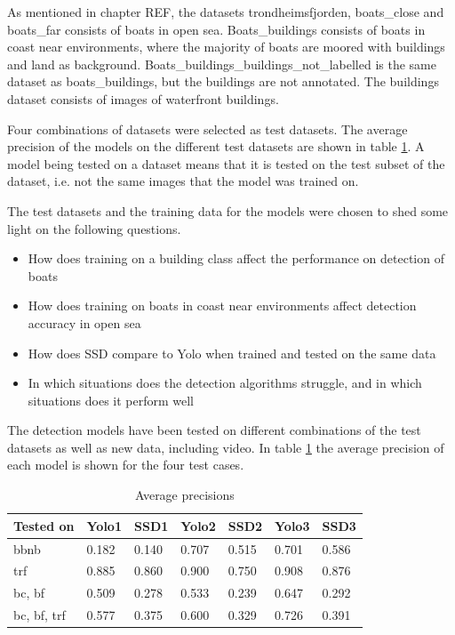 \vspace{3mm}

As mentioned in chapter REF, the datasets trondheimsfjorden, boats\_close and boats\_far consists of boats in open sea. Boats\_buildings consists of boats in coast near environments, where the majority of boats are moored with buildings and land as background. Boats\_buildings\_buildings\_not\_labelled is the same dataset as boats\_buildings, but the buildings are not annotated. The buildings dataset consists of images of waterfront buildings. 

\vspace{3mm}

Four combinations of datasets were selected as test datasets. The average precision of the models on the different test datasets are shown in table \ref{ap_tab}. A model being tested on a dataset means that it is tested on the test subset of the dataset, i.e. not the same images that the model was trained on.

\vspace{3mm}

The test datasets and the training data for the models were chosen to shed some light on the following questions.

\begin{itemize}
    \item How does training on a building class affect the performance on detection of boats
    \item How does training on boats in coast near environments affect detection accuracy in open sea
    \item How does SSD compare to Yolo when trained and tested on the same data
    \item In which situations does the detection algorithms struggle, and in which situations does it perform well
\end{itemize}




The detection models have been tested on different combinations of the test datasets as well as new data, including video. In table \ref{ap_tab} the average precision of each model is shown for the four test cases. 

\begin{table}[h!]
\centering
\begin{tabular}{l|ll|ll|ll}
Tested on   & Yolo1 & SSD1  & Yolo2 & SSD2  & Yolo3 & SSD3  \\ \hline
bbnb        & 0.182 & 0.140 & 0.707 & 0.515 & 0.701 & 0.586 \\
trf         & 0.885 & 0.860 & 0.900 & 0.750 & 0.908 & 0.876 \\
bc, bf      & 0.509 & 0.278 & 0.533 & 0.239 & 0.647 & 0.292 \\
bc, bf, trf & 0.577 & 0.375 & 0.600 & 0.329 & 0.726 & 0.391
\end{tabular}
\caption{Average precisions}
\label{ap_tab}
\end{table}

